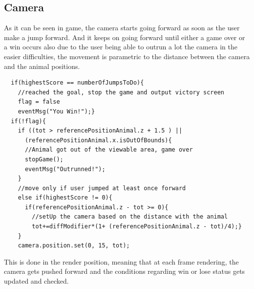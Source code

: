 \documentclass[a4paper, 11pt]{article}
\begin{document}
\subsection{Camera}
As it can be seen in game, the camera starts going forward as soon as the user make a jump forward. And it keeps on going forward until either a game over or a win occurs also due to the user being able to outrun a lot the camera in the easier difficulties, the movement is parametric to the distance between the camera and the animal positions.
\begin{lstlisting}
  if(highestScore == numberOfJumpsToDo){
    //reached the goal, stop the game and output victory screen
    flag = false
    eventMsg("You Win!");}
  if(!flag){
    if ((tot > referencePositionAnimal.z + 1.5 ) ||
      (referencePositionAnimal.x.isOutOfBounds){
      //Animal got out of the viewable area, game over
      stopGame();
      eventMsg("Outrunned!");
    }
    //move only if user jumped at least once forward
    else if(highestScore != 0){
      if(referencePositionAnimal.z - tot >= 0){
        //setUp the camera based on the distance with the animal
        tot+=diffModifier*(1+ (referencePositionAnimal.z - tot)/4);}
    }
    camera.position.set(0, 15, tot); 
\end{lstlisting}
This is done in the render position, meaning that at each frame rendering, the camera gets pushed forward and the conditions regarding win or lose status gets updated and checked.
\end{document}
